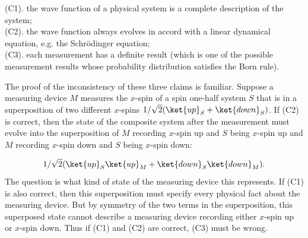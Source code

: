 (C1). the wave function of a physical system is a complete description of the system; \\
\indent (C2). the wave function always evolves in accord with a linear dynamical equation, e.g. the Schr\"{o}dinger equation; \\
\indent  (C3). each measurement has a definite result (which is one of the possible measurement results whose probability distribution satisfies the Born rule). %

The proof of the inconsistency of these three claims is familiar. 
Suppose a measuring device $M$ measures the $x$-spin of a spin one-half system $S$ that is in a superposition of two different $x$-spins $1/\sqrt{2}(\ket{up}_S+\ket{down}_S)$. If (C2) is correct, then the state of the composite system after the measurement must evolve into the superposition of $M$ recording $x$-spin up and $S$ being $x$-spin up and $M$ recording $x$-spin down and $S$ being $x$-spin down:

\begin{equation}
1/\sqrt{2}(\ket{up}_S \ket{up}_M+\ket{down}_S \ket{down}_M).
\label{ds}
\end{equation}
\noindent The question is what kind of state of the measuring device this represents.
If (C1) is also correct, then this superposition must specify every physical fact about the measuring device. But by symmetry of the two terms in the superposition, this superposed state cannot describe a measuring device recording either $x$-spin up or $x$-spin down. Thus if (C1) and (C2) are correct, (C3) must be wrong.

